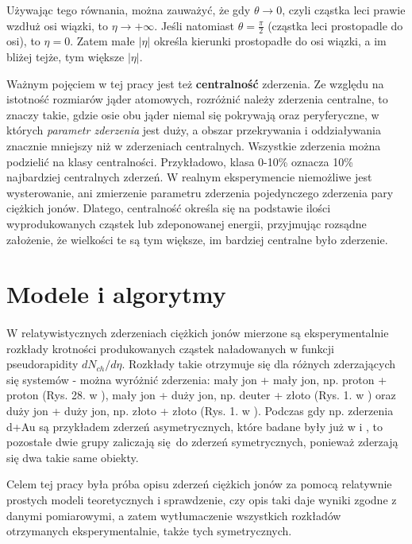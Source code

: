 \documentclass[a4paper,12pt]{article}
\begin{document}
Używając tego równania, można zauważyć, że gdy $\theta \to 0$, czyli cząstka leci prawie wzdłuż osi wiązki, to $\eta \to + \infty$. Jeśli natomiast $\theta = \frac{\pi}{2}$ (cząstka leci prostopadle do osi), to $\eta = 0$.
Zatem małe $|\eta|$ określa kierunki prostopadłe do osi wiązki, a im bliżej tejże, tym większe $|\eta|$.

Ważnym pojęciem w tej pracy jest też \textbf{centralność} zderzenia. Ze względu na istotność rozmiarów jąder atomowych, rozróżnić należy zderzenia centralne, to znaczy takie, gdzie osie obu jąder niemal się pokrywają oraz peryferyczne, w których \textit{parametr zderzenia} jest duży, a obszar przekrywania i oddziaływania znacznie mniejszy niż w zderzeniach centralnych. Wszystkie zderzenia można podzielić na klasy centralności. Przykładowo, klasa 0-10\% oznacza 10\% najbardziej centralnych zderzeń. W realnym eksperymencie niemożliwe jest wysterowanie, ani zmierzenie parametru zderzenia pojedynczego zderzenia pary ciężkich jonów. Dlatego, centralność określa się na podstawie ilości wyprodukowanych cząstek lub zdeponowanej energii, przyjmując rozsądne założenie, że wielkości te są tym większe, im bardziej centralne było zderzenie.


\newpage
\section{Modele i algorytmy}
\paragraph{}
W relatywistycznych zderzeniach ciężkich jonów mierzone są eksperymentalnie rozkłady krotności produkowanych cząstek naładowanych w funkcji pseudorapidity $dN_{ch}/d\eta$. Rozkłady takie otrzymuje się dla różnych zderzających się systemów - można wyróżnić zderzenia: mały jon + mały jon, np. proton + proton (Rys. 28. w \cite{Alver:2010ck}), mały jon + duży jon, np. deuter + złoto (Rys. 1. w \cite{Back:2004mr}) oraz duży jon + duży jon, np. złoto + złoto (Rys. 1. w \cite{Back:2002wb}). Podczas gdy np. zderzenia d+Au są przykładem zderzeń asymetrycznych, które badane były już w \cite{Barej:pracaInz18} i \cite{Barej:2017kcw}, to pozostałe dwie grupy zaliczają się do zderzeń symetrycznych, ponieważ zderzają się dwa takie same obiekty.

Celem tej pracy była próba opisu zderzeń ciężkich jonów za pomocą relatywnie prostych modeli teoretycznych i sprawdzenie, czy opis taki daje wyniki zgodne z danymi pomiarowymi, a zatem wytłumaczenie wszystkich rozkładów otrzymanych eksperymentalnie, także tych symetrycznych.
\end{document}
